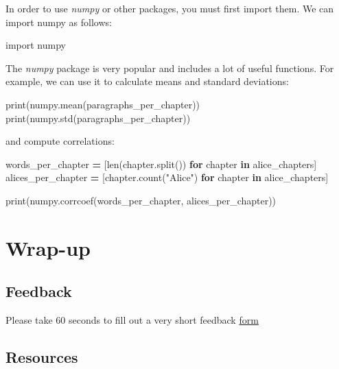\documentclass[]{book}
\newenvironment{Shaded}{\begin{snugshade}}{\end{snugshade}}
\newcommand{\KeywordTok}[1]{\textcolor[rgb]{0.13,0.29,0.53}{\textbf{#1}}}
\newcommand{\StringTok}[1]{\textcolor[rgb]{0.31,0.60,0.02}{#1}}
\newcommand{\ImportTok}[1]{#1}
\newcommand{\ControlFlowTok}[1]{\textcolor[rgb]{0.13,0.29,0.53}{\textbf{#1}}}
\newcommand{\OperatorTok}[1]{\textcolor[rgb]{0.81,0.36,0.00}{\textbf{#1}}}
\newcommand{\BuiltInTok}[1]{#1}
\newcommand{\NormalTok}[1]{#1}
\begin{document}
In order to use \emph{numpy} or other packages, you must first import
them. We can import numpy as follows:

\begin{Shaded}
\begin{Highlighting}[]
\ImportTok{import}\NormalTok{ numpy}
\end{Highlighting}
\end{Shaded}

The \emph{numpy} package is very popular and includes a lot of useful
functions. For example, we can use it to calculate means and standard
deviations:

\begin{Shaded}
\begin{Highlighting}[]
\BuiltInTok{print}\NormalTok{(numpy.mean(paragraphs_per_chapter))}
\BuiltInTok{print}\NormalTok{(numpy.std(paragraphs_per_chapter))}
\end{Highlighting}
\end{Shaded}

and compute correlations:

\begin{Shaded}
\begin{Highlighting}[]
\NormalTok{words_per_chapter }\OperatorTok{=}\NormalTok{ [}\BuiltInTok{len}\NormalTok{(chapter.split()) }\ControlFlowTok{for}\NormalTok{ chapter }\KeywordTok{in}\NormalTok{ alice_chapters]}
\NormalTok{alices_per_chapter }\OperatorTok{=}\NormalTok{ [chapter.count(}\StringTok{"Alice"}\NormalTok{) }\ControlFlowTok{for}\NormalTok{ chapter }\KeywordTok{in}\NormalTok{ alice_chapters]}

\BuiltInTok{print}\NormalTok{(numpy.corrcoef(words_per_chapter, alices_per_chapter))}
\end{Highlighting}
\end{Shaded}

\section{Wrap-up}\label{wrap-up-4}

\subsection{Feedback}\label{feedback-4}

Please take 60 seconds to fill out a very short feedback
\href{http://bit.ly/training_class_eval}{form}

\subsection{Resources}\label{resources-4}
\end{document}
